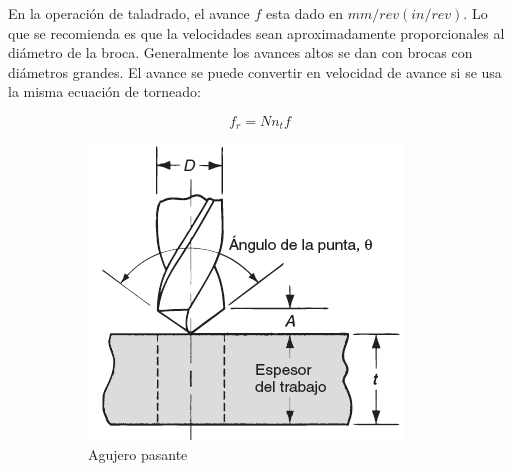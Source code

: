 En la operación de taladrado, el avance $f$ esta dado en $mm/rev(in/rev)$. Lo que se recomienda es que la velocidades sean aproximadamente proporcionales al diámetro de la broca. Generalmente los avances altos se dan con brocas con diámetros grandes. El avance se puede convertir en velocidad de avance si se usa la misma ecuación de torneado\citep{groover2007fundamentals}:

\begin{equation}
    f_{r}=N n_{t} f
\end{equation}
 
\begin{figure}[hbt]
    \centering
    \begin{subfigure}{0.3\textwidth}
        \centering
        \includegraphics[width=0.9\linewidth]{Cap1_FormulaciondelProyecto/Figuras/taladradopasante.PNG}
        \caption{Agujero pasante}
        \label{fig:AgujeroPasado}
    \end{subfigure} 
     \begin{subfigure}{0.3\textwidth}
        \centering

\end{subfigure}
\end{figure}
